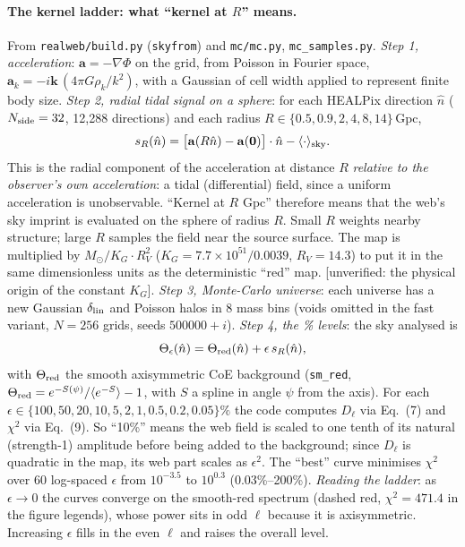 \documentclass[10pt,twocolumn]{article}
\newcommand{\flag}[1]{\textsf{[unverified: #1]}}
\begin{document}
\paragraph{The kernel ladder: what ``kernel at $R$'' means.} From \texttt{realweb/build.py} (\texttt{skyfrom}) and \texttt{mc/mc.py}, \texttt{mc\_samples.py}. \emph{Step 1, acceleration}: $\mathbf a=-\nabla\Phi$ on the grid, from Poisson in Fourier space, $\mathbf a_k=-i\mathbf k\,(4\pi G\rho_k/k^2)$, with a Gaussian of cell width applied to represent finite body size. \emph{Step 2, radial tidal signal on a sphere}: for each HEALPix direction $\hat n$ ($N_{\rm side}=32$, 12{,}288 directions) and each radius $R\in\{0.5,0.9,2,4,8,14\}$\,Gpc,
\begin{equation}
s_R(\hat n)=\big[\mathbf a(R\hat n)-\mathbf a(\mathbf 0)\big]\cdot\hat n-\langle\cdot\rangle_{\rm sky}.
\end{equation}
This is the radial component of the acceleration at distance $R$ \emph{relative to the observer's own acceleration}: a tidal (differential) field, since a uniform acceleration is unobservable. ``Kernel at $R$ Gpc'' therefore means that the web's sky imprint is evaluated on the sphere of radius $R$. Small $R$ weights nearby structure; large $R$ samples the field near the source surface. The map is multiplied by $M_\odot/K_G\cdot R_V^2$ ($K_G=7.7\times10^{51}/0.0039$, $R_V=14.3$) to put it in the same dimensionless units as the deterministic ``red'' map. \flag{the physical origin of the constant $K_G$}. \emph{Step 3, Monte-Carlo universe}: each universe has a new Gaussian $\delta_{\rm lin}$ and Poisson halos in 8 mass bins (voids omitted in the fast variant, $N=256$ grids, seeds $500000+i$). \emph{Step 4, the \% levels}: the sky analysed is
\begin{equation}
\Theta_\epsilon(\hat n)=\Theta_{\rm red}(\hat n)+\epsilon\,s_R(\hat n),
\end{equation}
with $\Theta_{\rm red}$ the smooth axisymmetric CoE background (\texttt{sm\_red}, $\Theta_{\rm red}=e^{-S(\psi)}/\langle e^{-S}\rangle-1$, with $S$ a spline in angle $\psi$ from the axis). For each $\epsilon\in\{100,50,20,10,5,2,1,0.5,0.2,0.05\}\%$ the code computes $D_\ell$ via Eq.~(7) and $\chi^2$ via Eq.~(9). So ``10\%'' means the web field is scaled to one tenth of its natural (strength-1) amplitude before being added to the background; since $D_\ell$ is quadratic in the map, its web part scales as $\epsilon^2$. The ``best'' curve minimises $\chi^2$ over 60 log-spaced $\epsilon$ from $10^{-3.5}$ to $10^{0.3}$ (0.03\%--200\%). \emph{Reading the ladder}: as $\epsilon\to0$ the curves converge on the smooth-red spectrum (dashed red, $\chi^2=471.4$ in the figure legends), whose power sits in odd $\ell$ because it is axisymmetric. Increasing $\epsilon$ fills in the even $\ell$ and raises the overall level.
\end{document}
